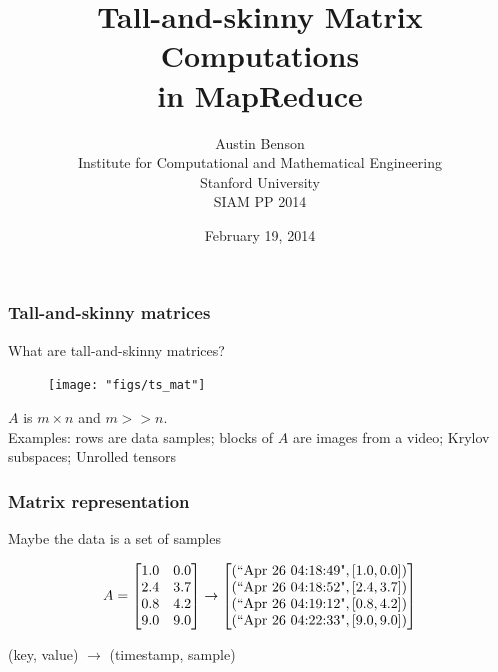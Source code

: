 \documentclass{beamer}
\title{Tall-and-skinny Matrix Computations \\
 in MapReduce}
\author{
Austin Benson \\
Institute for Computational and Mathematical Engineering \\
Stanford University \\
\vspace{0.2in}
SIAM PP 2014 \\
}
\date{February 19, 2014}
\begin{document}
\maketitle

\begin{frame}
\frametitle{Tall-and-skinny matrices}

What are tall-and-skinny matrices?

\begin{figure}[h!]
\centering
\texttt{[image: "figs/ts\_mat"]}
\end{figure}

$A$ is $m \times n$ and $m >> n$.  \\
Examples: rows are data samples; blocks of $A$ are images from a video; Krylov subspaces; Unrolled tensors

\end{frame}


\begin{frame}
\frametitle{Matrix representation}
Maybe the data is a set of samples

\vspace{0.2in}

\[
A = \begin{bmatrix} 1.0 & 0.0 \\ 2.4 & 3.7 \\ 0.8 & 4.2 \\ 9.0 & 9.0 \end{bmatrix} \rightarrow \begin{bmatrix}  (\text{``Apr 26 04:18:49"}, [1.0, 0.0]) \\  (\text{``Apr 26 04:18:52"}, [2.4, 3.7]) \\ (\text{``Apr 26 04:19:12"}, [0.8, 4.2]) \\ (\text{``Apr 26 04:22:33"}, [9.0, 9.0])  \end{bmatrix}
\]

\vspace{0.3in}
(key, value) $\rightarrow$ (timestamp, sample)

\end{frame}
\end{document}
